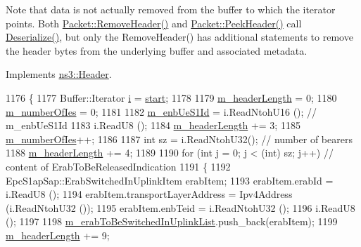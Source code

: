 Note that data is not actually removed from the buffer to which the iterator points. Both \hyperlink{classns3_1_1Packet_a0961eccf975d75f902d40956c93ba63e}{Packet\+::\+Remove\+Header()} and \hyperlink{classns3_1_1Packet_aadc63487bea70945c418f4c3e9b81964}{Packet\+::\+Peek\+Header()} call \hyperlink{classns3_1_1EpcS1APPathSwitchRequestAcknowledgeHeader_ab487b927de1ce730d417cbc878b6ec6c}{Deserialize()}, but only the Remove\+Header() has additional statements to remove the header bytes from the underlying buffer and associated metadata. 

Implements \hyperlink{classns3_1_1Header_a78be9400bb66b2a8543606f395ef5396}{ns3\+::\+Header}.


\begin{DoxyCode}
1176 \{
1177   Buffer::Iterator \hyperlink{bernuolliDistribution_8m_a6f6ccfcf58b31cb6412107d9d5281426}{i} = \hyperlink{namespacevisualizer_1_1core_a2a35e5d8a34af358b508dac8635754e0}{start};
1178 
1179   \hyperlink{classns3_1_1EpcS1APPathSwitchRequestAcknowledgeHeader_ab55a364f9ad48c5f1d3010054c9cb6d8}{m\_headerLength} = 0;
1180   \hyperlink{classns3_1_1EpcS1APPathSwitchRequestAcknowledgeHeader_a393eb3652a4fa93567b1310c95a24c34}{m\_numberOfIes} = 0;
1181 
1182   \hyperlink{classns3_1_1EpcS1APPathSwitchRequestAcknowledgeHeader_a1f2e10e79ee3cda4079736bf8d35114e}{m\_enbUeS1Id} = i.ReadNtohU16 ();     \textcolor{comment}{// m\_enbUeS1Id}
1183   i.ReadU8 ();           
1184   \hyperlink{classns3_1_1EpcS1APPathSwitchRequestAcknowledgeHeader_ab55a364f9ad48c5f1d3010054c9cb6d8}{m\_headerLength} += 3;
1185   \hyperlink{classns3_1_1EpcS1APPathSwitchRequestAcknowledgeHeader_a393eb3652a4fa93567b1310c95a24c34}{m\_numberOfIes}++;
1186 
1187   \textcolor{keywordtype}{int} sz = i.ReadNtohU32(); \textcolor{comment}{// number of bearers}
1188   \hyperlink{classns3_1_1EpcS1APPathSwitchRequestAcknowledgeHeader_ab55a364f9ad48c5f1d3010054c9cb6d8}{m\_headerLength} += 4;
1189 
1190   \textcolor{keywordflow}{for} (\textcolor{keywordtype}{int} j = 0; j < (int) sz; j++) \textcolor{comment}{// content of ErabToBeReleasedIndication}
1191   \{
1192     EpcS1apSap::ErabSwitchedInUplinkItem erabItem;
1193     erabItem.erabId = i.ReadU8 ();
1194     erabItem.transportLayerAddress = Ipv4Address (i.ReadNtohU32 ());
1195     erabItem.enbTeid = i.ReadNtohU32 ();
1196     i.ReadU8 ();
1197 
1198     \hyperlink{classns3_1_1EpcS1APPathSwitchRequestAcknowledgeHeader_a6a39047dd91a079998d2e261d4b4c5e0}{m\_erabToBeSwitchedInUplinkList}.push\_back(erabItem);
1199     \hyperlink{classns3_1_1EpcS1APPathSwitchRequestAcknowledgeHeader_ab55a364f9ad48c5f1d3010054c9cb6d8}{m\_headerLength} += 9;

\end{DoxyCode}
